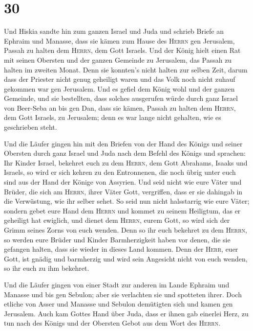 \hypertarget{section-29}{%
\section{30}\label{section-29}}

 Und Hiskia sandte hin zum ganzen Israel und Juda und
schrieb Briefe an Ephraim und Manasse, dass sie kämen zum Hause des
\textsc{Herrn} gen Jerusalem, Passah zu halten dem \textsc{Herrn}, dem
Gott Israels.  Und der König hielt einen Rat mit seinen
Obersten und der ganzen Gemeinde zu Jerusalem, das Passah zu halten im
zweiten Monat.  Denn sie konnten's nicht halten zur selben
Zeit, darum dass der Priester nicht genug geheiligt waren und das Volk
noch nicht zuhauf gekommen war gen Jerusalem.  Und es
gefiel dem König wohl und der ganzen Gemeinde,  und sie
bestellten, dass solches ausgerufen würde durch ganz Israel von
Beer-Seba an bis gen Dan, dass sie kämen, Passah zu halten dem
\textsc{Herrn}, dem Gott Israels, zu Jerusalem; denn es war lange nicht
gehalten, wie es geschrieben steht.

 Und die Läufer gingen hin mit den Briefen von der Hand
des Königs und seiner Obersten durch ganz Israel und Juda nach dem
Befehl des Königs und sprachen: Ihr Kinder Israel, bekehret euch zu dem
\textsc{Herrn}, dem Gott Abrahams, Isaaks und Israels, so wird er sich
kehren zu den Entronnenen, die noch übrig unter euch sind aus der Hand
der Könige von Assyrien.  Und seid nicht wie eure Väter
und Brüder, die sich am \textsc{Herrn}, ihrer Väter Gott, vergriffen,
dass er sie dahingab in die Verwüstung, wie ihr selber sehet.
 So seid nun nicht halsstarrig wie eure Väter; sondern
gebet eure Hand dem \textsc{Herrn} und kommet zu seinem Heiligtum, das
er geheiligt hat ewiglich, und dienet dem \textsc{Herrn}, eurem Gott, so
wird sich der Grimm seines Zorns von euch wenden.  Denn so
ihr euch bekehret zu dem \textsc{Herrn}, so werden eure Brüder und
Kinder Barmherzigkeit haben vor denen, die sie gefangen halten, dass sie
wieder in dieses Land kommen. Denn der \textsc{Herr}, euer Gott, ist
gnädig und barmherzig und wird sein Angesicht nicht von euch wenden, so
ihr euch zu ihm bekehret.

 Und die Läufer gingen von einer Stadt zur anderen im
Lande Ephraim und Manasse und bis gen Sebulon; aber sie verlachten sie
und spotteten ihrer.  Doch etliche von Asser und Manasse
und Sebulon demütigten sich und kamen gen Jerusalem. 
Auch kam Gottes Hand über Juda, dass er ihnen gab einerlei Herz, zu tun
nach des Königs und der Obersten Gebot aus dem Wort des \textsc{Herrn}.

